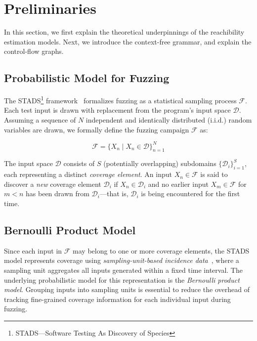 \documentclass[conference]{IEEEtran}
\begin{document}
\section{Preliminaries} \label{sec:model}
In this section, we first explain the theoretical underpinnings of the reachibility estimation models. 
Next, we introduce the context-free grammar, and explain
the control-flow graphs.
\subsection{Probabilistic Model for Fuzzing}
The STADS\footnote{STADS—Software Testing As Discovery of Species} framework~\cite{boehme2018stads,boehme2021residual,nguyen2022bedivfuzz,boehme2020boosting} formalizes
fuzzing as a statistical sampling process $\mathcal{F}$. Each test input is drawn with replacement from the program's input space $\pmb{\mathcal{D}}$. Assuming a sequence of $N$ independent and identically distributed (i.i.d.) random variables are drawn, we formally define the fuzzing campaign $\mathcal{F}$ as:

\begin{equation*}
    \mathcal{F}=\{X_n \mid X_n \in \pmb{\mathcal{D}}\}_{n=1}^N
\end{equation*}

The input space $\pmb{\mathcal{D}}$ consists of $S$ (potentially overlapping) subdomains $\{\mathcal{D}_i\}_{i=1}^S$, each representing a distinct \emph{coverage element}. An input $X_n \in \mathcal{F}$ is said to discover a \emph{new} coverage element $\mathcal{D}_i$ if $X_n \in \mathcal{D}_i$ and no earlier input $X_m \in \mathcal{F}$ for $m < n$ has been drawn from $\mathcal{D}_i$—that is, $\mathcal{D}_i$ is being encountered for the first time.


\subsection{Bernoulli Product Model}
Since each input in $\mathcal{F}$ may belong to one or more coverage elements, the STADS model represents coverage using \emph{sampling-unit-based incidence data}~\cite{colwell2012models,chao2017thirty}, where a sampling unit aggregates all inputs generated within a fixed time interval. The underlying probabilistic model for this representation is the \emph{Bernoulli product model}. Grouping inputs into sampling units is essential to reduce the overhead of tracking fine-grained coverage information for each individual input during fuzzing.
\end{document}
